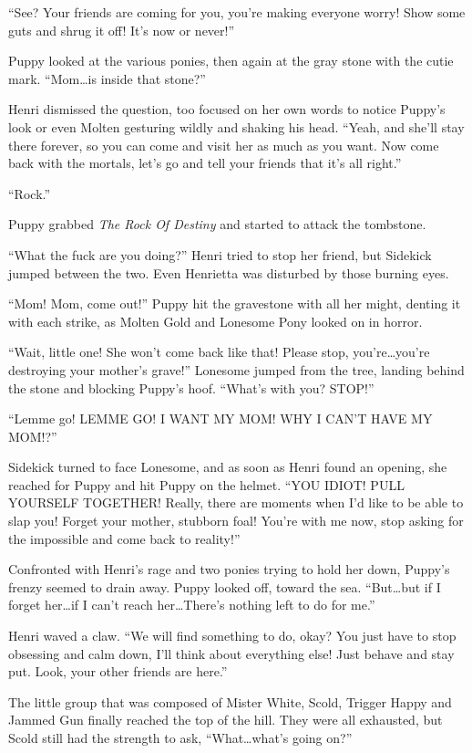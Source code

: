 ``See? Your friends are coming for you, you're making everyone worry! Show some guts and shrug it off! It's now or never!''

Puppy looked at the various ponies, then again at the gray stone with the cutie mark. ``Mom\dots is inside that stone?''

Henri dismissed the question, too focused on her own words to notice Puppy's look or even Molten gesturing wildly and shaking his head. ``Yeah, and she'll stay there forever, so you can come and visit her as much as you want. Now come back with the mortals, let's go and tell your friends that it's all right.''

``Rock.''

Puppy grabbed \emph{The Rock Of Destiny}\/ and started to attack the tombstone.

``What the fuck are you doing?'' Henri tried to stop her friend, but Sidekick jumped between the two. Even Henrietta was disturbed by those burning eyes.

``Mom! Mom, come out!'' Puppy hit the gravestone with all her might, denting it with each strike, as Molten Gold and Lonesome Pony looked on in horror.

``Wait, little one! She won't come back like that! Please stop, you're\dots you're destroying your mother's grave!'' Lonesome jumped from the tree, landing behind the stone and blocking Puppy's hoof. ``What's with you? STOP!''

``Lemme go! LEMME GO! I WANT MY MOM! WHY I CAN'T HAVE MY MOM!?''

Sidekick turned to face Lonesome, and as soon as Henri found an opening, she reached for Puppy and hit Puppy on the helmet. ``YOU IDIOT! PULL YOURSELF TOGETHER! Really, there are moments when I'd like to be able to slap you! Forget your mother, stubborn foal! You're with me now, stop asking for the impossible and come back to reality!''

Confronted with Henri's rage and two ponies trying to hold her down, Puppy's frenzy seemed to drain away. Puppy looked off, toward the sea. ``But\dots but if I forget her\dots if I can't reach her\dots There's nothing left to do for me.''

Henri waved a claw. ``We will find something to do, okay? You just have to stop obsessing and calm down, I'll think about everything else! Just behave and stay put. Look, your other friends are here.''

The little group that was composed of Mister White, Scold, Trigger Happy and Jammed Gun finally reached the top of the hill. They were all exhausted, but Scold still had the strength to ask, ``What\dots what's going on?''

